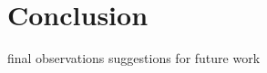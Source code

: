 \clearpage
\section{Conclusion}

final observations
suggestions for future work













































\clearemptydoublepage

\appendix
% 
% 
% 

\clearemptydoublepage


% 


